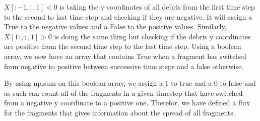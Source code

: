 \documentclass{article}
\begin{document}
$X[:-1, :, 1] < 0$ is taking the y coordinates of all debris from the first time step to the second to last time step and checking if they are negative. It will assign a True to the negative values and a False to the positive values. Similarly, $X[1:, :, 1] > 0$ is doing the same thing but checking if the debris y coordinates are positive from the second time step to the last time step. Using a boolean array, we now have an array that contains True when a fragment has switched from negative to positive between successive time steps and a false otherwise.

By using np.sum on this boolean array, we assign a 1 to true and a 0 to false and as such can count all of the fragments in a given timestep that have switched from a negative y coordinate to a positive one. Therefor, we have defined a flux for the fragments that gives information about the spread of all fragments.
\end{document}
